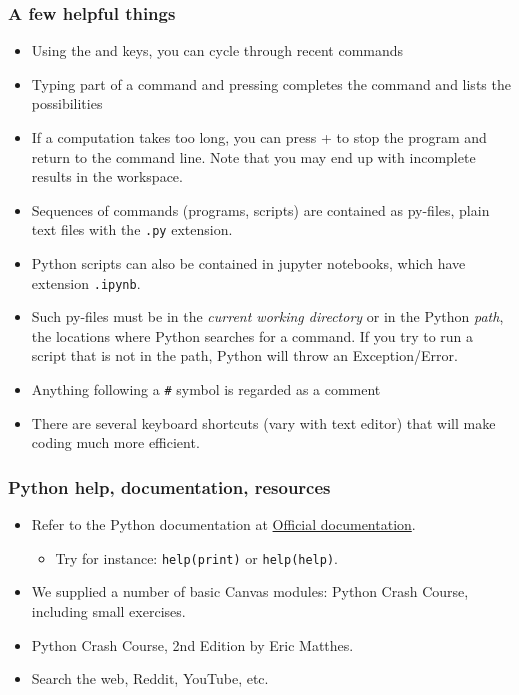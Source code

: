  
 {\nologo
 \begin{frame}[fragile]
  \frametitle{A few helpful things}
  \begin{itemize}[<+->]
    \item Using the \keystroke{$\uparrow$} and \keystroke{$\downarrow$} keys, you can cycle through recent commands
    \item Typing part of a command and pressing  completes the command and lists the possibilities
    \item If a computation takes too long, you can press + to stop the program and return to the command line. Note that you may end up with incomplete results in the workspace.
    \item Sequences of commands (programs, scripts) are contained as py-files, plain text files with the \lstinline$.py$ extension.
    \item Python scripts can also be contained in jupyter notebooks, which have extension \lstinline$.ipynb$.
    \item Such py-files must be in the \emph{current working directory} or in the Python \emph{path}, the locations where Python searches for a command. If you try to run a script that is not in the path, Python will throw an Exception/Error.
    \item Anything following a \lstinline$#$ symbol is regarded as a comment
    \item There are several keyboard shortcuts (vary with text editor) that will make coding much more efficient.
  \end{itemize}
\end{frame}
}

\begin{frame}[fragile]
\frametitle{Python help, documentation, resources}
\begin{itemize}[<+->]
  \item Refer to the Python documentation at \href{https://docs.python.org/3/}{Official documentation}.
  \begin{itemize}
    \item Try for instance: \lstinline$help(print)$ or \lstinline$help(help)$.
  \end{itemize}
  \item We supplied a number of basic Canvas modules: Python Crash Course, including small exercises.
  \item Python Crash Course, 2nd Edition by Eric Matthes.
  \item Search the web, Reddit, YouTube, etc.
\end{itemize}
\end{frame}

